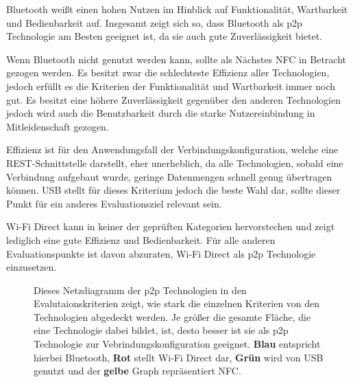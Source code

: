 		Bluetooth weißt einen hohen Nutzen im Hinblick auf Funktionalität, Wartbarkeit und Bedienbarkeit auf. Insgesamt zeigt sich so, dass Bluetooth als p2p Technologie am Besten geeignet ist, da sie auch gute Zuverlässigkeit bietet.
		
		Wenn Bluetooth nicht genutzt werden kann, sollte als Nächstes NFC in Betracht gezogen werden. Es besitzt zwar die schlechteste Effizienz aller Technologien, jedoch erfüllt es die Kriterien der Funktionalität und Wartbarkeit immer noch gut. Es besitzt eine höhere Zuverlässigkeit gegenüber den anderen Technologien jedoch wird auch die Benutzbarkeit durch die starke Nutzereinbindung in Mitleidenschaft gezogen.
		
		Effizienz ist für den Anwendungsfall der Verbindungskonfiguration, welche eine REST-Schnittstelle darstellt, eher unerheblich, da alle Technologien, sobald eine Verbindung aufgebaut wurde, geringe Datenmengen schnell genug übertragen können. USB stellt für dieses Kriterium jedoch die beste Wahl dar, sollte dieser Punkt für ein anderes Evaluationsziel relevant sein.
		
		Wi-Fi Direct kann in keiner der geprüften Kategorien hervorstechen und zeigt lediglich eine gute Effizienz und Bedienbarkeit. Für alle anderen Evaluationspunkte ist davon abzuraten, Wi-Fi Direct als p2p Technologie einzusetzen.
		
    \begin{figure}[ht]
    \centering
    \caption[Netzdiagramm der p2p Technologien in den Evalutaionskriterien]{Dieses Netzdiagramm der p2p Technologien in den Evalutaionskriterien zeigt, wie stark die einzelnen Kriterien von den Technologien abgedeckt werden. Je größer die gesamte Fläche, die eine Technologie dabei bildet, ist, desto besser ist sie als p2p Technologie zur Vebrindungskonfiguration geeignet. {\bf Blau} entspricht hierbei Bluetooth, {\bf Rot} stellt Wi-Fi Direct dar, {\bf Grün} wird von USB genutzt und der {\bf gelbe} Graph repräsentiert NFC. } \label{fig:rating}
    \end{figure}